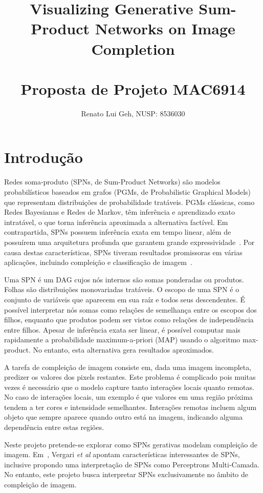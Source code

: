 \documentclass[12pt]{article}
\title{%
  Visualizing Generative Sum-Product Networks on Image Completion\\~\\
  {\normalfont Proposta de Projeto MAC6914}
}
\author{Renato Lui Geh, NUSP: 8536030}
\date{}
\theoremstyle{plain}
\numberwithin{equation}{section}
\begin{document}
\maketitle

\section{Introdução}

Redes soma-produto (SPNs, de Sum-Product Networks) são modelos probabilísticos baseados em grafos
(PGMs, de Probabilistic Graphical Models) que representam distribuições de probabilidade tratáveis.
PGMs clássicas, como Redes Bayesianas e Redes de Markov, têm inferência e aprendizado exato
intratável, o que torna inferência aproximada a alternativa factível. Em contrapartida, SPNs
possuem inferência exata em tempo linear, além de possuírem uma arquitetura profunda que garantem
grande expressividade~\cite{shallow-vs-deep}. Por causa destas características, SPNs tiveram
resultados promissoras em várias aplicações, incluindo compleição e classificação de
imagem~\cite{poon-domingos,gens-domingos,clustering}.

Uma SPN é um DAG cujos nós internos são somas ponderadas ou produtos. Folhas são distribuições
monovariadas tratáveis. O escopo de uma SPN é o conjunto de variáveis que aparecem em sua raíz e
todos seus descendentes. É possível interpretar nós somas como relações de semelhança entre
os escopos dos filhos, enquanto que produtos podem ser vistos como relações de independência entre
filhos. Apesar de inferência exata ser linear, é possível computar mais rapidamente a probabilidade
maximum-a-priori (MAP) usando o algoritmo max-product. No entanto, esta alternativa gera resultados
aproximados.

A tarefa de compleição de imagem consiste em, dada uma imagem incompleta, predizer os valores dos
pixels restantes. Este problema é complicado pois muitas vezes é necessário que o modelo capture
tanto interações locais quanto remotas. No caso de interações locais, um exemplo é que valores em
uma região próxima tendem a ter cores e intensidade semelhantes. Interações remotas incluem algum
objeto que sempre aparece quando outro está na imagem, indicando alguma dependência entre estas
regiões.

Neste projeto pretende-se explorar como SPNs gerativas modelam compleição de imagem.
Em~\cite{visualizing}, Vergari \textit{et al} apontam características interessantes de SPNs,
inclusive propondo uma interpretação de SPNs como Perceptrons Multi-Camada. No entanto, este
projeto busca interpretar SPNs exclusivamente no âmbito de compleição de imagem.
\end{document}
